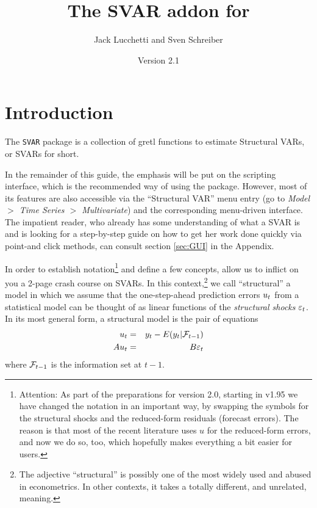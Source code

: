 \documentclass[a4paper,10pt]{article}
\title{The SVAR addon for \app{gretl}}
\author{Jack Lucchetti and Sven Schreiber}
\date{Version 2.1}
\newcommand{\app}[1]{\textsf{#1}}
\newcounter{script}[section]
\newcommand{\PrE}[1]{\ensuremath u_{#1}} %
\newcommand{\StS}[1]{\ensuremath \varepsilon_{#1}} %
\newcommand{\InfSet}[1]{\ensuremath \mathcal{F}_{#1}}
\begin{document}
\maketitle

\tableofcontents

\clearpage

\section{Introduction}
\label{sec:intro}

The \texttt{SVAR} package is a collection of \app{gretl} functions to
estimate Structural VARs, or SVARs for short. 

In the remainder of this guide, the emphasis will be put on the
scripting interface, which is the recommended way of using the
package. However, most of its features are also accessible via the
``Structural VAR'' menu entry (go to \emph{Model $>$ Time Series $>$
  Multivariate}) and the corresponding menu-driven interface. The
impatient reader, who already has some understanding of what a SVAR is
and is looking for a step-by-step guide on how to get her work done
quickly via point-and click methods, can consult section \ref{sec:GUI}
in the Appendix.

In order to establish notation\footnote{Attention: As part of the preparations
for version 2.0, starting in v1.95 we have changed the notation in an important
way, by swapping the symbols for the structural shocks and the reduced-form
residuals (forecast errors). The reason is that most of the recent literature
uses $u$ for the reduced-form errors, and now we do so, too, which hopefully
makes everything a bit easier for users.}
 and define a few concepts, allow us to
inflict on you a 2-page crash course on SVARs.  In this
context,\footnote{The adjective ``structural'' is possibly one of the
  most widely used and abused in econometrics. In other contexts, it
  takes a totally different, and unrelated, meaning.} we call
``structural'' a model in which we assume that the one-step-ahead
prediction errors $\PrE{t}$ from a statistical model can be thought of
as linear functions of the \emph{structural shocks} $\StS{t}$. In its
most general form, a structural model is the pair of equations
\begin{eqnarray}
  \label{eq:one-step-ahead}
  \PrE{t} & = & y_t - E(y_t | \InfSet{t-1}) \\
  \label{eq:PrE-StS-AB}
  A \PrE{t} & = & B \StS{t}
\end{eqnarray}
where $\InfSet{t-1}$ is the information set at $t-1$.
\end{document}
